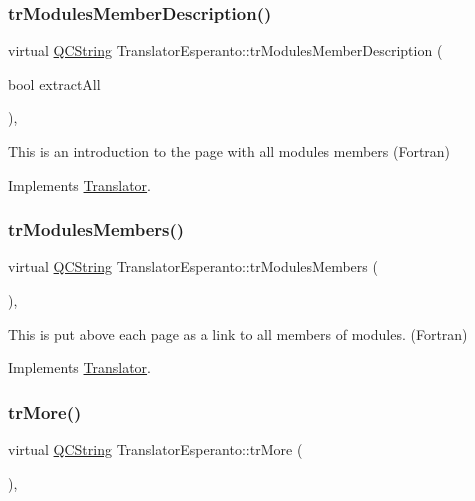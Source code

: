 \subsubsection{\texorpdfstring{trModulesMemberDescription()}{trModulesMemberDescription()}}
{\footnotesize\ttfamily virtual \mbox{\hyperlink{class_q_c_string}{Q\+C\+String}} Translator\+Esperanto\+::tr\+Modules\+Member\+Description (\begin{DoxyParamCaption}\item[{bool}]{extract\+All }\end{DoxyParamCaption})\hspace{0.3cm}{\ttfamily [inline]}, {\ttfamily [virtual]}}

This is an introduction to the page with all modules members (Fortran) 

Implements \mbox{\hyperlink{class_translator}{Translator}}.

\mbox{\label{class_translator_esperanto_a7945639d2093d6c631741a447bab98fc}} 
\subsubsection{\texorpdfstring{trModulesMembers()}{trModulesMembers()}}
{\footnotesize\ttfamily virtual \mbox{\hyperlink{class_q_c_string}{Q\+C\+String}} Translator\+Esperanto\+::tr\+Modules\+Members (\begin{DoxyParamCaption}{ }\end{DoxyParamCaption})\hspace{0.3cm}{\ttfamily [inline]}, {\ttfamily [virtual]}}

This is put above each page as a link to all members of modules. (Fortran) 

Implements \mbox{\hyperlink{class_translator}{Translator}}.

\mbox{\label{class_translator_esperanto_a986f70fe60b13570f668b9c773291e45}} 
\subsubsection{\texorpdfstring{trMore()}{trMore()}}
{\footnotesize\ttfamily virtual \mbox{\hyperlink{class_q_c_string}{Q\+C\+String}} Translator\+Esperanto\+::tr\+More (\begin{DoxyParamCaption}{ }\end{DoxyParamCaption})\hspace{0.3cm}{\ttfamily [inline]}, {\ttfamily [virtual]}}

